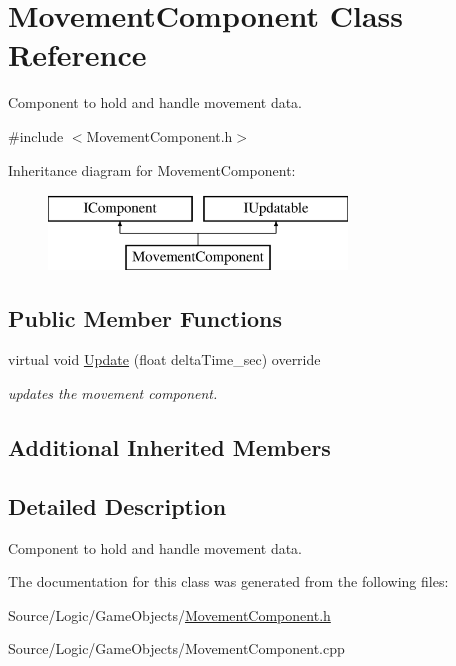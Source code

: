\hypertarget{class_movement_component}{}\section{Movement\+Component Class Reference}
\label{class_movement_component}


Component to hold and handle movement data.  




{\ttfamily \#include $<$Movement\+Component.\+h$>$}

Inheritance diagram for Movement\+Component\+:\begin{figure}[H]
\begin{center}
\leavevmode
\includegraphics[height=2.000000cm]{class_movement_component}
\end{center}
\end{figure}
\subsection*{Public Member Functions}
\begin{DoxyCompactItemize}
\item 
\mbox{\label{class_movement_component_ae366501e0dbaf79deaab508cf5a0b86e}} 
virtual void \mbox{\hyperlink{class_movement_component_ae366501e0dbaf79deaab508cf5a0b86e}{Update}} (float delta\+Time\+\_\+sec) override
\begin{DoxyCompactList}\small\item\em updates the movement component. \end{DoxyCompactList}\end{DoxyCompactItemize}
\subsection*{Additional Inherited Members}


\subsection{Detailed Description}
Component to hold and handle movement data. 

The documentation for this class was generated from the following files\+:\begin{DoxyCompactItemize}
\item 
Source/\+Logic/\+Game\+Objects/\mbox{\hyperlink{_movement_component_8h}{Movement\+Component.\+h}}\item 
Source/\+Logic/\+Game\+Objects/Movement\+Component.\+cpp\end{DoxyCompactItemize}
